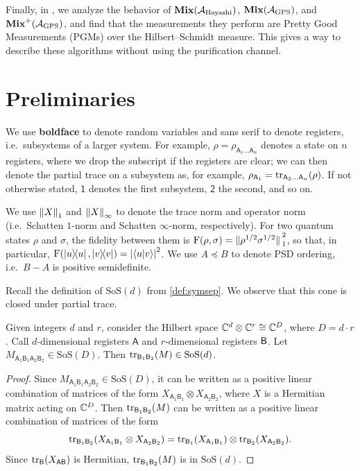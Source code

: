 \documentclass{article}
\newcommand{\mixed}{\textup{\textbf{Mix}}}
\newcommand{\gps}{\calA_{\mathrm{GPS}}}
\newcommand{\hayashi}{\calA_{\mathrm{Hayashi}}}
\newcommand{\symsep}{\mathrm{SoS}}
\newcommand{\reg}[1]{\mathsf{#1}}
\begin{document}
Finally, in , we analyze the behavior of $\mixed(\hayashi)$, $\mixed(\gps)$, and $\mixed^+(\gps)$, and find that the measurements they perform are Pretty Good Measurements (PGMs) over the Hilbert--Schmidt measure.
This gives a way to describe these algorithms without using the purification channel.

\section{Preliminaries} \label{sec:prelims}

We use \textbf{boldface} to denote random variables and \textsf{sans serif} to denote registers, i.e.\ subsystems of a larger system. 
For example, $\rho = \rho_{\reg{A}_1\dots\reg{A}_n}$ denotes a state on $n$ registers, where we drop the subscript if the registers are clear; we can then denote the partial trace on a subsystem as, for example, $\rho_{\reg{A}_1} = \tr_{\reg{A}_2\dots\reg{A}_n}(\rho)$.
If not otherwise stated, $\reg{1}$ denotes the first subsystem, $\reg{2}$ the second, and so on.

We use $\norm{X}_1$ and $\norm{X}_\infty$ to denote the trace norm and operator norm (i.e.\ Schatten $1$-norm and Schatten $\infty$-norm, respectively).
For two quantum states $\rho$ and $\sigma$, the fidelity between them is $\mathrm{F}(\rho, \sigma) = \norm*{\rho^{1/2} \sigma^{1/2}}_1^2$, so that, in particular, $\mathrm{F}(\ketbra{u}, \ketbra{v}) = \abs{\braket{u}{v}}^2$.
We use $A \preceq B$ to denote PSD ordering, i.e.\ $B - A$ is positive semidefinite.

Recall the definition of $\symsep(d)$ from \cref{def:symsep}.
We observe that this cone is closed under partial trace.

\begin{proposition}\label{prop:symset-partial-trace}
Given integers $d$ and $r$,
consider the Hilbert space $\mathbb C^d \otimes \mathbb C^r \cong \mathbb C^D$,
where $D = d \cdot r$.
Call $d$-dimensional registers $\reg{A}$ and $r$-dimensional registers $\reg{B}\textsl{}$.
Let $M_{\reg{A}_1\reg{B}_1\reg{A}_2\reg{B}_2} \in \symsep(D)$. Then
$\tr_{\reg{B}_1\reg{B}_2}(M) \in \symsep(d)$.
\end{proposition}
\begin{proof}
    Since $M_{\reg{A}_1\reg{B}_1\reg{A}_2\reg{B}_2} \in \symsep(D)$,
    it can be written as a positive linear combination of matrices of the form $X_{\reg{A}_1\reg{B}_1} \otimes X_{\reg{A}_2\reg{B}_2}$, where $X$ is a Hermitian matrix acting on $\mathbb C^D$.
    Then $\tr_{\reg{B}_1\reg{B}_2}(M)$
    can be written as a positive linear combination of matrices of the form 
    \begin{equation*}
        \tr_{\reg{B}_1\reg{B}_2}(X_{\reg{A}_1\reg{B}_1} \otimes X_{\reg{A}_2\reg{B}_2})
        = \tr_{\reg{B}_1}(X_{\reg{A}_1\reg{B}_1}) \otimes \tr_{\reg{B}_2}(X_{\reg{A}_2\reg{B}_2}).
    \end{equation*}
    Since $\tr_{\reg{B}}(X_{\reg{AB}})$ is Hermitian, $\tr_{\reg{B}_1\reg{B}_2}(M)$ is in $\symsep(d)$.
\end{proof}
\end{document}
